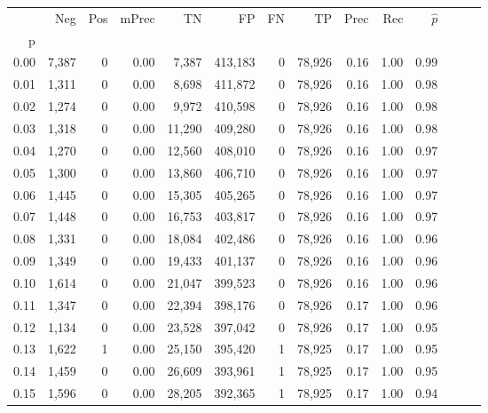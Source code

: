 \begin{tabular}{rrrrrrrrrrrrrr}
\toprule
{} &     Neg &    Pos & mPrec &       TN &       FP &      FN &      TP &  Prec &   Rec & $\hat{p}$ \\
p    &         &        &       &          &          &         &         &       &       &           \\
\midrule
0.00 &   7,387 &      0 &  0.00 &    7,387 &  413,183 &       0 &  78,926 &  0.16 &  1.00 &      0.99 \\
0.01 &   1,311 &      0 &  0.00 &    8,698 &  411,872 &       0 &  78,926 &  0.16 &  1.00 &      0.98 \\
0.02 &   1,274 &      0 &  0.00 &    9,972 &  410,598 &       0 &  78,926 &  0.16 &  1.00 &      0.98 \\
0.03 &   1,318 &      0 &  0.00 &   11,290 &  409,280 &       0 &  78,926 &  0.16 &  1.00 &      0.98 \\
0.04 &   1,270 &      0 &  0.00 &   12,560 &  408,010 &       0 &  78,926 &  0.16 &  1.00 &      0.97 \\
0.05 &   1,300 &      0 &  0.00 &   13,860 &  406,710 &       0 &  78,926 &  0.16 &  1.00 &      0.97 \\
0.06 &   1,445 &      0 &  0.00 &   15,305 &  405,265 &       0 &  78,926 &  0.16 &  1.00 &      0.97 \\
0.07 &   1,448 &      0 &  0.00 &   16,753 &  403,817 &       0 &  78,926 &  0.16 &  1.00 &      0.97 \\
0.08 &   1,331 &      0 &  0.00 &   18,084 &  402,486 &       0 &  78,926 &  0.16 &  1.00 &      0.96 \\
0.09 &   1,349 &      0 &  0.00 &   19,433 &  401,137 &       0 &  78,926 &  0.16 &  1.00 &      0.96 \\
0.10 &   1,614 &      0 &  0.00 &   21,047 &  399,523 &       0 &  78,926 &  0.16 &  1.00 &      0.96 \\
0.11 &   1,347 &      0 &  0.00 &   22,394 &  398,176 &       0 &  78,926 &  0.17 &  1.00 &      0.96 \\
0.12 &   1,134 &      0 &  0.00 &   23,528 &  397,042 &       0 &  78,926 &  0.17 &  1.00 &      0.95 \\
0.13 &   1,622 &      1 &  0.00 &   25,150 &  395,420 &       1 &  78,925 &  0.17 &  1.00 &      0.95 \\
0.14 &   1,459 &      0 &  0.00 &   26,609 &  393,961 &       1 &  78,925 &  0.17 &  1.00 &      0.95 \\
0.15 &   1,596 &      0 &  0.00 &   28,205 &  392,365 &       1 &  78,925 &  0.17 &  1.00 &      0.94 \\

\end{tabular}
